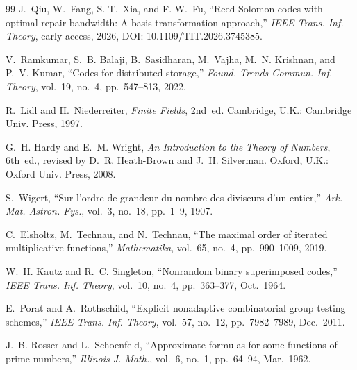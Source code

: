 \documentclass[11pt,onecolumn]{IEEEtran}
\begin{document}
\begin{thebibliography}{99}
J.~Qiu, W.~Fang, S.-T.~Xia, and F.-W.~Fu,
``Reed-Solomon codes with optimal repair bandwidth: A basis-transformation approach,''
\emph{IEEE Trans. Inf. Theory}, early access, 2026, DOI: 10.1109/TIT.2026.3745385.

V.~Ramkumar, S.~B. Balaji, B.~Sasidharan, M.~Vajha,
M.~N. Krishnan, and P.~V. Kumar,
``Codes for distributed storage,''
\emph{Found. Trends Commun. Inf. Theory}, vol.~19, no.~4,
pp.~547--813, 2022.

R.~Lidl and H.~Niederreiter,
\emph{Finite Fields}, 2nd~ed.
Cambridge, U.K.: Cambridge Univ. Press, 1997.

G.~H. Hardy and E.~M. Wright,
\emph{An Introduction to the Theory of Numbers}, 6th~ed., revised by D.~R. Heath-Brown and J.~H. Silverman.
Oxford, U.K.: Oxford Univ. Press, 2008.

S.~Wigert,
``Sur l'ordre de grandeur du nombre des diviseurs d'un entier,''
\emph{Ark. Mat. Astron. Fys.}, vol.~3, no.~18, pp.~1--9, 1907.

C.~Elsholtz, M.~Technau, and N.~Technau,
``The maximal order of iterated multiplicative functions,''
\emph{Mathematika}, vol.~65, no.~4, pp.~990--1009, 2019.

W.~H. Kautz and R.~C. Singleton,
``Nonrandom binary superimposed codes,''
\emph{IEEE Trans. Inf. Theory}, vol.~10, no.~4, pp.~363--377, Oct.~1964.

E.~Porat and A.~Rothschild,
``Explicit nonadaptive combinatorial group testing schemes,''
\emph{IEEE Trans. Inf. Theory}, vol.~57, no.~12, pp.~7982--7989, Dec.~2011.

J.~B. Rosser and L.~Schoenfeld,
``Approximate formulas for some functions of prime numbers,''
\emph{Illinois J. Math.}, vol.~6, no.~1, pp.~64--94, Mar.~1962.
\end{thebibliography}
\end{document}
